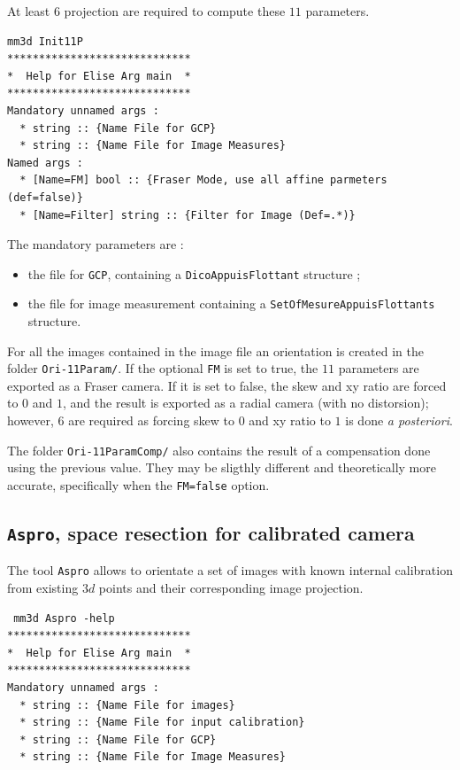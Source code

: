 At least $6$ projection are required to compute these $11$ parameters. 



\begin{verbatim}
mm3d Init11P
*****************************
*  Help for Elise Arg main  *
*****************************
Mandatory unnamed args : 
  * string :: {Name File for GCP}
  * string :: {Name File for Image Measures}
Named args : 
  * [Name=FM] bool :: {Fraser Mode, use all affine parmeters (def=false)}
  * [Name=Filter] string :: {Filter for Image (Def=.*)}
\end{verbatim}

The mandatory parameters are :

\begin {itemize}
  \item the file for {\tt GCP}, containing a {\tt DicoAppuisFlottant} structure ;
  \item the file for image measurement containing a {\tt SetOfMesureAppuisFlottants} structure.
\end {itemize}

For all the images contained in the image file an orientation is created in the folder {\tt Ori-11Param/}.
If the optional {\tt FM} is set to true, the $11$ parameters are exported as a Fraser camera. If it is
set to false, the skew and xy ratio are forced to $0$ and $1$, and the result is exported as a radial camera (with
no distorsion); however, $6$ are required as forcing skew to $0$ and xy ratio to $1$ is done
\emph{a posteriori}. 

The folder {\tt Ori-11ParamComp/} also contains the result of a compensation done using the previous value.
They may be sligthly different and theoretically more accurate, specifically when the {\tt FM=false} option.


\subsection{{\tt Aspro}, space resection for calibrated camera}


The tool {\tt Aspro} allows to orientate a set of images with known internal calibration
 from existing $3d$ points and their corresponding image projection.

\begin{verbatim}
 mm3d Aspro -help
*****************************
*  Help for Elise Arg main  *
*****************************
Mandatory unnamed args : 
  * string :: {Name File for images}
  * string :: {Name File for input calibration}
  * string :: {Name File for GCP}
  * string :: {Name File for Image Measures}
\end{verbatim}

